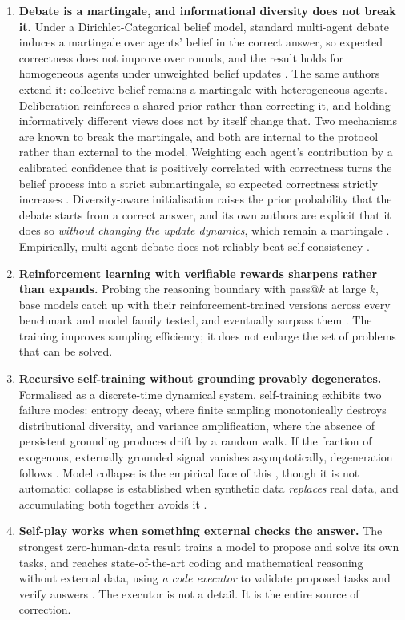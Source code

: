\documentclass[11pt]{article}
\begin{document}
\begin{enumerate}[label=(\arabic*),itemsep=4pt]
\item \textbf{Debate is a martingale, and informational diversity does not break it.} Under a Dirichlet-Categorical belief model, standard multi-agent debate induces a martingale over agents' belief in the correct answer, so expected correctness does not improve over rounds, and the result holds for homogeneous agents under unweighted belief updates \cite{choi2025debatevote}. The same authors extend it: collective belief remains a martingale with heterogeneous agents. Deliberation reinforces a shared prior rather than correcting it, and holding informatively different views does not by itself change that. Two mechanisms are known to break the martingale, and both are internal to the protocol rather than external to the model. Weighting each agent's contribution by a calibrated confidence that is positively correlated with correctness turns the belief process into a strict submartingale, so expected correctness strictly increases \cite{zhu2026debate}. Diversity-aware initialisation raises the prior probability that the debate starts from a correct answer, and its own authors are explicit that it does so \emph{without changing the update dynamics}, which remain a martingale \cite{zhu2026debate}. Empirically, multi-agent debate does not reliably beat self-consistency \cite{mad2024}.
\item \textbf{Reinforcement learning with verifiable rewards sharpens rather than expands.} Probing the reasoning boundary with pass@$k$ at large $k$, base models catch up with their reinforcement-trained versions across every benchmark and model family tested, and eventually surpass them \cite{yue2025rlvr}. The training improves sampling efficiency; it does not enlarge the set of problems that can be solved.
\item \textbf{Recursive self-training without grounding provably degenerates.} Formalised as a discrete-time dynamical system, self-training exhibits two failure modes: entropy decay, where finite sampling monotonically destroys distributional diversity, and variance amplification, where the absence of persistent grounding produces drift by a random walk. If the fraction of exogenous, externally grounded signal vanishes asymptotically, degeneration follows \cite{zenil2026limits}. Model collapse is the empirical face of this \cite{shumailov2024collapse}, though it is not automatic: collapse is established when synthetic data \emph{replaces} real data, and accumulating both together avoids it \cite{gerstgrasser2024}.
\item \textbf{Self-play works when something external checks the answer.} The strongest zero-human-data result trains a model to propose and solve its own tasks, and reaches state-of-the-art coding and mathematical reasoning without external data, using \emph{a code executor} to validate proposed tasks and verify answers \cite{zhao2025absolutezero}. The executor is not a detail. It is the entire source of correction.
\end{enumerate}
\end{document}
